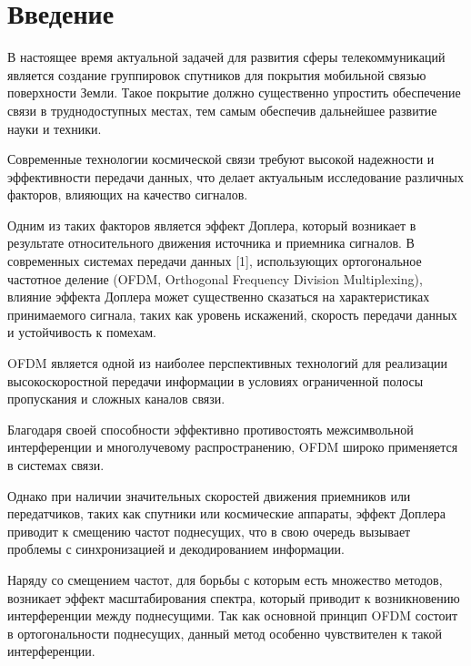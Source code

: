 \section{Введение}

В настоящее время актуальной задачей для развития сферы телекоммуникаций
является создание группировок спутников для покрытия мобильной связью 
поверхности Земли. Такое покрытие должно существенно упростить обеспечение
связи в труднодоступных местах, тем самым обеспечив дальнейшее развитие науки и
техники.  

Современные технологии космической связи требуют высокой надежности и
эффективности передачи данных, что делает актуальным исследование
различных факторов, влияющих на качество сигналов.

Одним из таких факторов
является эффект Доплера, который возникает в результате относительного
движения источника и приемника сигналов. В современных системах передачи
данных [1], использующих ортогональное частотное деление (OFDM,
Orthogonal Frequency Division Multiplexing), влияние эффекта Доплера может
существенно сказаться на характеристиках принимаемого сигнала, таких как
уровень искажений, скорость передачи данных и устойчивость к помехам.

OFDM является одной из наиболее перспективных технологий для
реализации высокоскоростной передачи информации в условиях ограниченной
полосы пропускания и сложных каналов связи.

Благодаря своей способности
эффективно противостоять межсимвольной интерференции и многолучевому
распространению, OFDM широко применяется в системах связи.


Однако при
наличии значительных скоростей движения приемников или передатчиков,
таких как спутники или космические аппараты, эффект Доплера приводит к
смещению частот поднесущих, что в свою очередь вызывает проблемы с
синхронизацией и декодированием информации.

Наряду со смещением частот, для борьбы с которым есть множество методов,
возникает эффект масштабирования спектра, который приводит к возникновению
интерференции между поднесущими. Так как основной принцип OFDM состоит в ортогональности
поднесущих, данный метод особенно чувствителен к такой интерференции.

